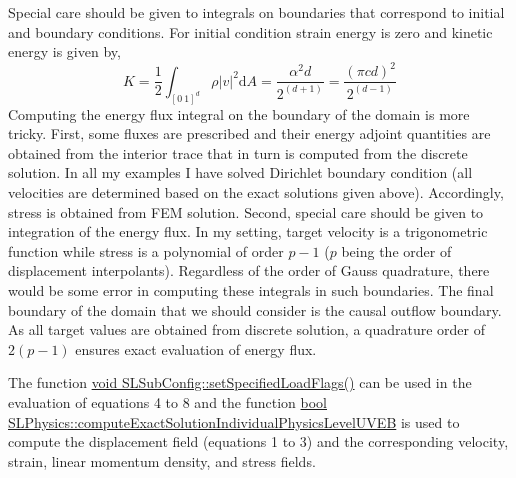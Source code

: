 \documentclass[12pt]{article}
\begin{document}
Special care should be given to integrals on boundaries that correspond to initial and boundary conditions. For initial condition strain energy is zero and kinetic energy is given by,
\begin{equation}
K = \frac12 \int_{[0 \ 1]^d} \rho |v|^2 \mathrm{d} A = \frac{\alpha^2 d}{2^{(d + 1)}} = \frac{(\pi  c d)^2}{2^{(d-1)}} 
\end{equation}
%
Computing the energy flux integral on the boundary of the domain is more tricky. First, some fluxes are prescribed and their energy adjoint quantities are obtained from the interior trace that in turn is computed from the discrete solution. In all my examples I have solved Dirichlet boundary condition (all velocities are determined based on the exact solutions given above). Accordingly, stress is obtained from FEM solution. Second, special care should be given to integration of the energy flux. In my setting, target velocity is a trigonometric function while stress is a polynomial of order $p - 1$ ($p$ being the order of displacement interpolants). Regardless of the order of Gauss quadrature, there would be some error in computing these integrals in such boundaries. The final boundary of the domain that we should consider is the causal outflow boundary. As all target values are obtained from discrete solution, a quadrature order of $2 (p - 1)$ ensures exact evaluation of energy flux.



The function \underline{void SLSubConfig::setSpecifiedLoadFlags()} can be used in the evaluation of equations 4 to 8 and the function 
 \underline{bool SLPhysics::computeExactSolutionIndividualPhysicsLevelUVEB} is used to compute the displacement field (equations 1 to 3) and the corresponding velocity, strain, linear momentum density, and stress fields.

% 
%
\end{document}
